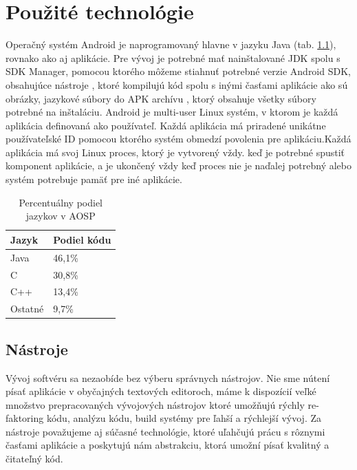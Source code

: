\chapter{Použité technológie}

Operačný systém Android je naprogramovaný hlavne v jazyku Java \cite{android_code}  (tab. \ref{tab:android_code}), rovnako ako aj aplikácie. Pre vývoj je potrebné mať nainštalované JDK spolu s  SDK Manager, pomocou ktorého môžeme stiahnuť potrebné verzie Android SDK, obsahujúce nástroje , ktoré kompilujú kód spolu s inými časťami aplikácie ako sú obrázky, jazykové súbory do APK archívu , ktorý obsahuje všetky súbory potrebné na inštaláciu. Android je multi-user Linux systém, v ktorom je každá aplikácia definovaná ako používateľ. Každá aplikácia má priradené unikátne používateľské ID pomocou ktorého systém obmedzí povolenia pre aplikáciu.Každá aplikácia má svoj Linux proces, ktorý je vytvorený vždy. keď je potrebné spustiť komponent aplikácie, a je ukončený vždy keď proces nie je naďalej potrebný alebo systém potrebuje pamäť pre iné aplikácie.


\vspace{10pt}

\begin{table}[hb!]
    \centering
    \begin{tabular}{| l | l | }
    \hline
        Jazyk   &   Podiel kódu     \\  \hline
        Java    &   46,1\%          \\  \hline
        C       &   30,8\%          \\  \hline
        C++     &   13,4\%          \\  \hline
        Ostatné &   9,7\%           \\  \hline
    \end{tabular}
    \caption{Percentuálny podiel jazykov v AOSP}
    \label{tab:android_code}
\end{table}

\section{Nástroje}

Vývoj softvéru sa nezaobíde bez výberu správnych nástrojov. Nie sme nútení písať aplikácie v obyčajných textových editoroch, máme k dispozícií veľké množstvo prepracovaných vývojových nástrojov ktoré umožňujú rýchly re-faktoring kódu, analýzu kódu, build systémy pre ľahší a rýchlejší vývoj. Za nástroje považujeme aj súčasné technológie, ktoré uľahčujú prácu s rôznymi časťami aplikácie a poskytujú nám abstrakciu, ktorá umožní písať kvalitný a čitateľný kód.

